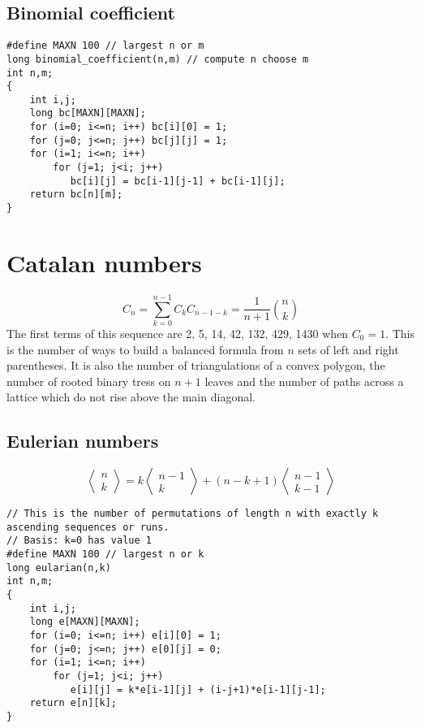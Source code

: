 \documentclass[a4paper]{article}
\begin{document}
\subsection{Binomial coefficient}

\begin{verbatim}
#define MAXN 100 // largest n or m
long binomial_coefficient(n,m) // compute n choose m
int n,m;
{
    int i,j;
    long bc[MAXN][MAXN];
    for (i=0; i<=n; i++) bc[i][0] = 1;
    for (j=0; j<=n; j++) bc[j][j] = 1;
    for (i=1; i<=n; i++)
        for (j=1; j<i; j++)
           bc[i][j] = bc[i-1][j-1] + bc[i-1][j];
    return bc[n][m];
}
\end{verbatim}

\section{Catalan numbers}

\begin{equation}
	C_{n}=\sum_{k=0}^{n-1}C_{k}C_{n-1-k}=\frac{1}{n+1}{n\choose k}
\end{equation}
The first terms of this sequence are 2, 5, 14, 42, 132, 429, 1430 when $C_{0} = 1$. This is the number of ways to build a balanced formula from $n$ sets of left and right parentheses. It is also the number of triangulations of a convex polygon, the number of rooted binary tress on $n+1$ leaves and the number of paths across a lattice which do not rise above the main diagonal.

\subsection{Eulerian numbers}

\begin{equation}
\left\langle\begin{matrix}
n \\ k
\end{matrix}\right\rangle=k\left\langle\begin{matrix}
n-1 \\ k
\end{matrix}\right\rangle+(n-k+1)\left\langle\begin{matrix}
n-1 \\ k-1
\end{matrix}\right\rangle
\end{equation}

\begin{verbatim}
// This is the number of permutations of length n with exactly k ascending sequences or runs.
// Basis: k=0 has value 1
#define MAXN 100 // largest n or k
long eularian(n,k)
int n,m;
{
    int i,j;
    long e[MAXN][MAXN];
    for (i=0; i<=n; i++) e[i][0] = 1;
    for (j=0; j<=n; j++) e[0][j] = 0;
    for (i=1; i<=n; i++)
        for (j=1; j<i; j++)
           e[i][j] = k*e[i-1][j] + (i-j+1)*e[i-1][j-1];
    return e[n][k];
}
\end{verbatim}
\end{document}
